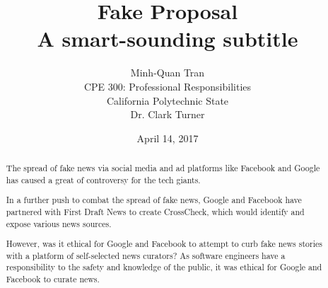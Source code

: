 


\title{\vfill Fake Proposal\\
\vspace{8pt}
\normalsize{A smart-sounding subtitle}
}

\author{Minh-Quan Tran\\
\normalsize{CPE 300: Professional Responsibilities}\\
\normalsize{California Polytechnic State}\\
\normalsize{Dr. Clark Turner}
}

\date{April 14, 2017}

\maketitle


\vfill

%
%
%

\begin{abstract}
The spread of fake news via social media and ad platforms like Facebook and Google has caused a great of controversy for the tech giants. \cite{telegraph_fake_news}

In a further push to combat the spread of fake news, Google and Facebook have partnered with First Draft News to create CrossCheck, \cite{crosscheck_launch} which would identify and expose various news sources.

However, was it ethical for Google and Facebook to attempt to curb fake news stories with a platform of self-selected news curators? As software engineers have a responsibility to the safety and knowledge of the public, it was ethical for Google and Facebook to curate news.
\end{abstract}

\thispagestyle{empty} 
\pagebreak